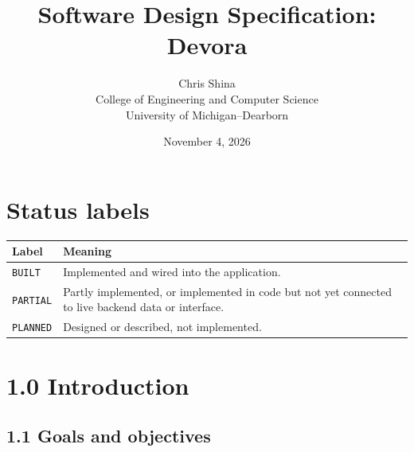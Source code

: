 \documentclass[11pt,letterpaper]{article}
\title{\textbf{Software Design Specification: Devora}}
\author{Chris Shina \\ College of Engineering and Computer Science \\ University of Michigan--Dearborn}
\date{November 4, 2026}
\begin{document}
\maketitle

\section*{Status labels}

\begin{table}[h!]
\centering
\begin{tabularx}{\textwidth}{l Y}
\toprule
\textbf{Label} & \textbf{Meaning} \\
\midrule
\texttt{BUILT} & Implemented and wired into the application. \\
\texttt{PARTIAL} & Partly implemented, or implemented in code but not yet connected to live backend data or interface. \\
\texttt{PLANNED} & Designed or described, not implemented. \\
\bottomrule
\end{tabularx}
\end{table}

\section*{1.0 Introduction}

\subsection*{1.1 Goals and objectives}
\end{document}
